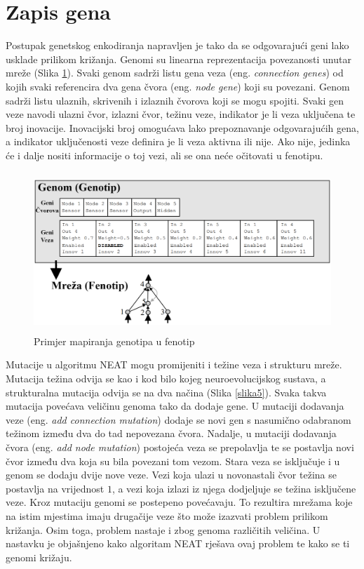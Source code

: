 \documentclass[times, utf8, diplomski, numeric]{fer}
\begin{document}
\section{Zapis gena}
Postupak genetskog enkodiranja napravljen je tako da se odgovarajući geni lako usklade prilikom križanja. Genomi su linearna reprezentacija povezanosti unutar mreže (Slika \ref{slika4}). Svaki genom sadrži listu gena veza (eng. \textit{connection genes}) od kojih svaki referencira dva gena čvora (eng. \textit{node gene}) koji su povezani. Genom sadrži listu ulaznih, skrivenih i izlaznih čvorova koji se mogu spojiti. Svaki gen veze navodi ulazni čvor, izlazni čvor, težinu veze, indikator je li veza uključena te broj inovacije. Inovacijski broj omogućava lako prepoznavanje odgovarajućih gena, a indikator uključenosti veze definira je li veza aktivna ili nije. Ako nije, jedinka će i dalje nositi informacije o toj vezi, ali se ona neće očitovati u fenotipu.

\begin{figure}
  \centering
  \includegraphics[height=6cm]{slika4}
  \caption{Primjer mapiranja genotipa u fenotip \citep{rad2}}
  \label{slika4}
\end{figure}

Mutacije u algoritmu NEAT mogu promijeniti i težine veza i strukturu mreže. Mutacija težina odvija se kao i kod bilo kojeg neuroevolucijskog sustava, a strukturalna mutacija odvija se na dva načina (Slika \ref{slika5}). Svaka takva mutacija povećava veličinu genoma tako da dodaje gene. U mutaciji dodavanja veze (eng. \textit{add connection mutation}) dodaje se novi gen s nasumično odabranom težinom između dva do tad nepovezana čvora. Nadalje, u mutaciji dodavanja čvora (eng. \textit{add node mutation}) postojeća veza se prepolavlja te se postavlja novi čvor između dva koja su bila povezani tom vezom. Stara veza se isključuje i u genom se dodaju dvije nove veze. Vezi koja ulazi u novonastali čvor težina se postavlja na vrijednost $1$, a vezi koja izlazi iz njega dodjeljuje se težina isključene veze. Kroz mutaciju genomi se postepeno povećavaju. To rezultira mrežama koje na istim mjestima imaju drugačije veze što može izazvati problem prilikom križanja. Osim toga, problem nastaje i zbog genoma različitih veličina. U nastavku je objašnjeno kako algoritam NEAT rješava ovaj problem te kako se ti genomi križaju.
\end{document}
